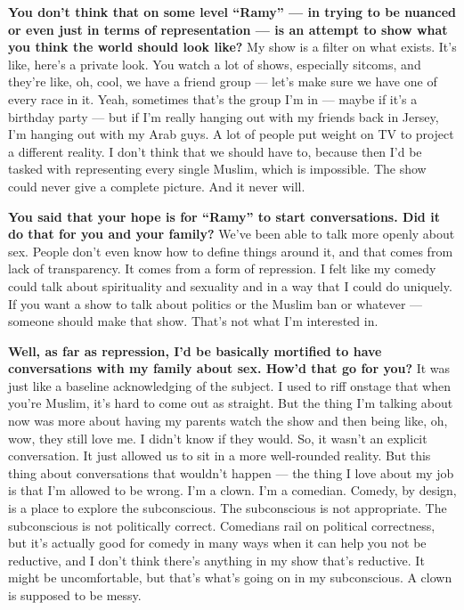 \textbf{You don't think that on some level ``Ramy'' --- in trying to be
nuanced or even just in terms of representation --- is an attempt to
show what you think the world should look like?} My show is a filter on
what exists. It's like, here's a private look. You watch a lot of shows,
especially sitcoms, and they're like, oh, cool, we have a friend group
--- let's make sure we have one of every race in it. Yeah, sometimes
that's the group I'm in --- maybe if it's a birthday party --- but if
I'm really hanging out with my friends back in Jersey, I'm hanging out
with my Arab guys. A lot of people put weight on TV to project a
different reality. I don't think that we should have to, because then
I'd be tasked with representing every single Muslim, which is
impossible. The show could never give a complete picture. And it never
will.

\textbf{You said that your hope is for ``Ramy'' to start conversations.
Did it do that for you and your family?} We've been able to talk more
openly about sex. People don't even know how to define things around it,
and that comes from lack of transparency. It comes from a form of
repression. I felt like my comedy could talk about spirituality and
sexuality and in a way that I could do uniquely. If you want a show to
talk about politics or the Muslim ban or whatever --- someone should
make that show. That's not what I'm interested in.

\textbf{Well, as far as repression, I'd be basically mortified to have
conversations with my family about sex. How'd that go for you?} It was
just like a baseline acknowledging of the subject. I used to riff
onstage that when you're Muslim, it's hard to come out as straight. But
the thing I'm talking about now was more about having my parents watch
the show and then being like, oh, wow, they still love me. I didn't know
if they would. So, it wasn't an explicit conversation. It just allowed
us to sit in a more well-rounded reality. But this thing about
conversations that wouldn't happen --- the thing I love about my job is
that I'm allowed to be wrong. I'm a clown. I'm a comedian. Comedy, by
design, is a place to explore the subconscious. The subconscious is not
appropriate. The subconscious is not politically correct. Comedians rail
on political correctness, but it's actually good for comedy in many ways
when it can help you not be reductive, and I don't think there's
anything in my show that's reductive. It might be uncomfortable, but
that's what's going on in my subconscious. A clown is supposed to be
messy.

